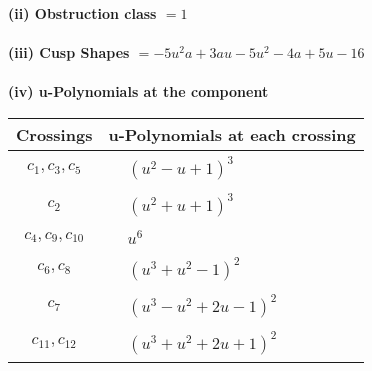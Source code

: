 \documentclass[1p]{elsarticle_modified}
\theoremstyle{definition}
\begin{document}
\flushleft \textbf{(ii) Obstruction class $= 1$}\\~\\
\flushleft \textbf{(iii) Cusp Shapes $= -5 u^2 a+3 a u-5 u^2-4 a+5 u-16$}\\~\\
\newpage\renewcommand{\arraystretch}{1}
\flushleft \textbf{(iv) u-Polynomials at the component}\newline \\
\begin{tabular}{m{50pt}|m{274pt}}
Crossings & \hspace{64pt}u-Polynomials at each crossing \\
\hline $$\begin{aligned}c_{1},c_{3},c_{5}\end{aligned}$$&$\begin{aligned}
&(u^2- u+1)^3
\end{aligned}$\\
\hline $$\begin{aligned}c_{2}\end{aligned}$$&$\begin{aligned}
&(u^2+u+1)^3
\end{aligned}$\\
\hline $$\begin{aligned}c_{4},c_{9},c_{10}\end{aligned}$$&$\begin{aligned}
&u^6
\end{aligned}$\\
\hline $$\begin{aligned}c_{6},c_{8}\end{aligned}$$&$\begin{aligned}
&(u^3+u^2-1)^2
\end{aligned}$\\
\hline $$\begin{aligned}c_{7}\end{aligned}$$&$\begin{aligned}
&(u^3- u^2+2 u-1)^2
\end{aligned}$\\
\hline $$\begin{aligned}c_{11},c_{12}\end{aligned}$$&$\begin{aligned}
&(u^3+u^2+2 u+1)^2
\end{aligned}$\\
\hline
\end{tabular}\\~\\
\end{document}
